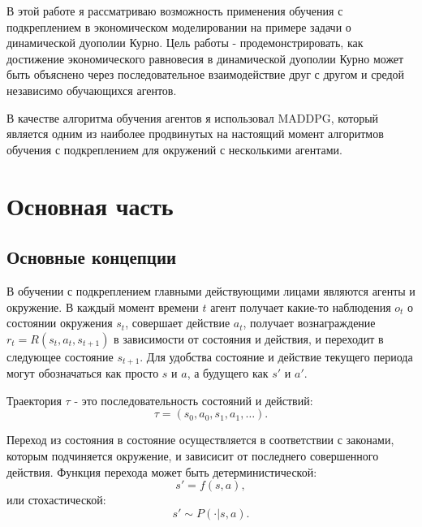 \documentclass[12pt, a4paper]{extarticle}
\theoremstyle{definition}
\begin{document}
В этой работе я рассматриваю возможность применения обучения с подкреплением в экономическом моделировании на примере задачи о динамической дуополии Курно. Цель работы - продемонстрировать, как достижение экономического равновесия в динамической дуополии Курно может быть объяснено через последовательное взаимодействие друг с другом и средой независимо обучающихся агентов. 

В качестве алгоритма обучения агентов я использовал MADDPG, который является \cite{lideep} одним из наиболее продвинутых на настоящий момент алгоритмов обучения с подкреплением для окружений с несколькими агентами.



\newpage
\section{Основная часть}
\subsection{Основные концепции}
В обучении с подкреплением главными действующими лицами являются агенты и окружение. В каждый момент времени $t$ агент получает какие-то наблюдения $o_t$ о состоянии окружения $s_t$, совершает действие $a_t$, получает вознаграждение $r_t = R(s_{t},a_t,s_{t+1})$ в зависимости от состояния и действия, и переходит в следующее состояние $s_{t+1}$. Для удобства состояние и действие текущего периода могут обозначаться как просто $s$ и $a$, а будущего как $s'$ и $a'$.  

Траектория $\tau$ - это последовательность состояний и действий:
\begin{equation}
    \tau = (s_0,a_0,s_1,a_1,\ldots).
\end{equation}

Переход из состояния в состояние осуществляется в соответствии с законами, которым подчиняется окружение, и зависисит от последнего совершенного действия. Функция перехода может быть детерминистической:
\begin{equation}
    s' = f(s,a),
\end{equation}
или стохастической:
\begin{equation}
    s' \sim P(\cdot|s,a).
\end{equation}
\end{document}
